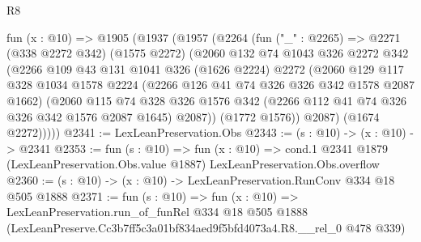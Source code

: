 \begin{lexlean}{R8}
\begin{coremodule}
  fun (x : @10) =>
  @1905
    (@1937
      (@1957
        (@2264
          (fun ("_" : @2265) =>
          @2271
            (@338 @2272 @342)
            (@1575 @2272)
            (@2060
              @132
              @74
              @1043
              @326
              @2272
              @342
              (@2266
                @109
                @43
                @131
                @1041
                @326
                (@1626 @2224)
                @2272
                (@2060
                  @129
                  @117
                  @328
                  @1034
                  @1578
                  @2224
                  (@2266 @126 @41 @74 @326 @326 @342 @1578 @2087 @1662)
                  (@2060
                    @115
                    @74
                    @328
                    @326
                    @1576
                    @342
                    (@2266 @112 @41 @74 @326 @326 @342 @1576 @2087 @1645)
                    @2087))
                (@1772 @1576))
              @2087)
            (@1674 @2272)))))
@2341 := LexLeanPreservation.Obs
@2343 := (s : @10) -> (x : @10) -> @2341
@2353 := fun (s : @10) =>
  fun (x : @10) =>
  cond.{1} @2341 @1879 (LexLeanPreservation.Obs.value @1887) LexLeanPreservation.Obs.overflow
@2360 := (s : @10) -> (x : @10) -> LexLeanPreservation.RunConv @334 @18 @505 @1888
@2371 := fun (s : @10) =>
  fun (x : @10) =>
  LexLeanPreservation.run_of_funRel
    @334
    @18
    @505
    @1888
    (LexLeanPreserve.Cc3b7ff5c3a01bf834aed9f5bfd4073a4.R8.__rel_0 @478 @339)
\end{coremodule}
\end{lexlean}
